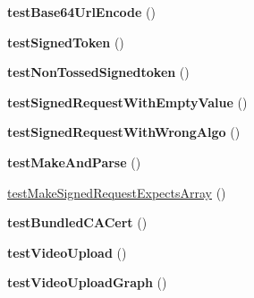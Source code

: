 \begin{DoxyCompactItemize}
\item 
\hypertarget{class_p_h_p_s_d_k_test_case_ab8dfb4d08295f2cfcca51064fea0e312}{{\bfseries test\-Base64\-Url\-Encode} ()}\label{class_p_h_p_s_d_k_test_case_ab8dfb4d08295f2cfcca51064fea0e312}

\item 
\hypertarget{class_p_h_p_s_d_k_test_case_a947e5852211940d71a26033ab2a14efa}{{\bfseries test\-Signed\-Token} ()}\label{class_p_h_p_s_d_k_test_case_a947e5852211940d71a26033ab2a14efa}

\item 
\hypertarget{class_p_h_p_s_d_k_test_case_a6e650ea2f0be9210c25fff4f569050a4}{{\bfseries test\-Non\-Tossed\-Signedtoken} ()}\label{class_p_h_p_s_d_k_test_case_a6e650ea2f0be9210c25fff4f569050a4}

\item 
\hypertarget{class_p_h_p_s_d_k_test_case_a2d67223d10ac25dda1f8689590f0604f}{{\bfseries test\-Signed\-Request\-With\-Empty\-Value} ()}\label{class_p_h_p_s_d_k_test_case_a2d67223d10ac25dda1f8689590f0604f}

\item 
\hypertarget{class_p_h_p_s_d_k_test_case_a62a8e84147e7e9485a2bf03e77da6b8a}{{\bfseries test\-Signed\-Request\-With\-Wrong\-Algo} ()}\label{class_p_h_p_s_d_k_test_case_a62a8e84147e7e9485a2bf03e77da6b8a}

\item 
\hypertarget{class_p_h_p_s_d_k_test_case_a8861f1ae8f15dac700505018b962b4a2}{{\bfseries test\-Make\-And\-Parse} ()}\label{class_p_h_p_s_d_k_test_case_a8861f1ae8f15dac700505018b962b4a2}

\item 
\hyperlink{class_p_h_p_s_d_k_test_case_a9b126ad47c652998c07a77b9c7c7655e}{test\-Make\-Signed\-Request\-Expects\-Array} ()
\item 
\hypertarget{class_p_h_p_s_d_k_test_case_a2b96cb4912cb7816fe88ed5b6d03cb24}{{\bfseries test\-Bundled\-C\-A\-Cert} ()}\label{class_p_h_p_s_d_k_test_case_a2b96cb4912cb7816fe88ed5b6d03cb24}

\item 
\hypertarget{class_p_h_p_s_d_k_test_case_a944d4ed78caf4efdcf3a19f853c1be7f}{{\bfseries test\-Video\-Upload} ()}\label{class_p_h_p_s_d_k_test_case_a944d4ed78caf4efdcf3a19f853c1be7f}

\item 
\hypertarget{class_p_h_p_s_d_k_test_case_a6acfdb963e6f52b4b53014c7a3edebfd}{{\bfseries test\-Video\-Upload\-Graph} ()}\label{class_p_h_p_s_d_k_test_case_a6acfdb963e6f52b4b53014c7a3edebfd}


\end{DoxyCompactItemize}
